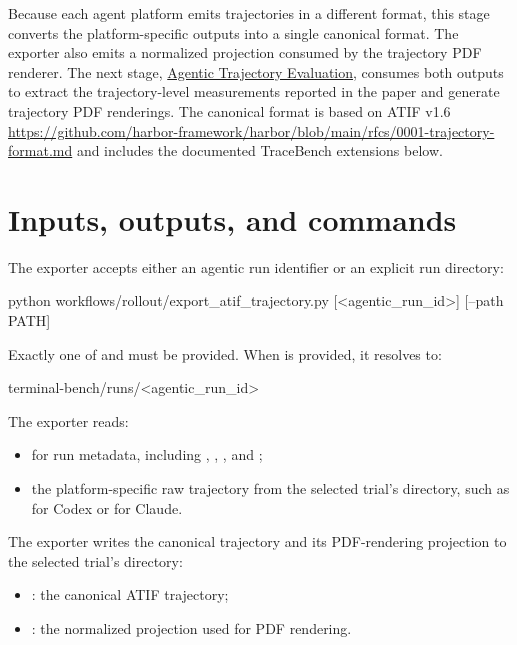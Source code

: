 \documentclass[11pt]{article}
\begin{document}
\label{docstart:atif_transcription}
Because each agent platform emits trajectories in a different format, this stage converts the platform-specific outputs into a single canonical format.
The exporter also emits a normalized projection consumed by the trajectory PDF renderer.
The next stage, \href{agentic_trajectory_evaluation.pdf}{Agentic Trajectory Evaluation}, consumes both outputs to extract the trajectory-level measurements reported in the paper and generate trajectory PDF renderings.
The canonical format is based on ATIF v1.6 \url{https://github.com/harbor-framework/harbor/blob/main/rfcs/0001-trajectory-format.md} and includes the documented TraceBench extensions below.

\section*{Inputs, outputs, and commands}

The exporter accepts either an agentic run identifier or an explicit run directory:
\begin{DocCode}
python workflows/rollout/export_atif_trajectory.py [<agentic_run_id>] [--path PATH]
\end{DocCode}
Exactly one of  and  must be provided.
When  is provided, it resolves to:
\begin{DocCode}
terminal-bench/runs/<agentic_run_id>
\end{DocCode}

The exporter reads:
\begin{itemize}
  \item {} for run metadata, including , , , and ;
  \item the platform-specific raw trajectory from the selected trial's  directory, such as  for Codex or  for Claude.
\end{itemize}

The exporter writes the canonical trajectory and its PDF-rendering projection to the selected trial's  directory:
\begin{itemize}
  \item {}: the canonical ATIF trajectory;
  \item {}: the normalized projection used for PDF rendering.
\end{itemize}
\end{document}
